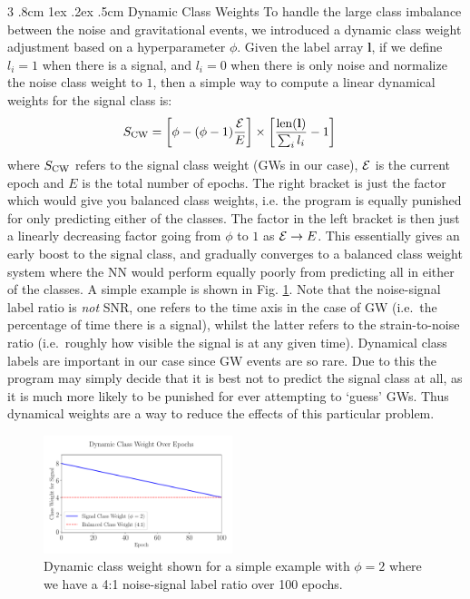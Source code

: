 \documentclass[%
reprint,
amsmath,amssymb,
aps,
]{revtex4-2}
\makeatletter
\renewcommand{\subsubsection}{%
	\@startsection
	{subsubsection}%
	{3}%
	{\z@}%
	{.8cm \@plus1ex \@minus .2ex}%
	{.5cm}%
	{\normalfont\small\centering}%
}
\makeatother
\begin{document}
\subsubsection{Dynamic Class Weights}
To handle the large class imbalance between the noise and gravitational events, we introduced a dynamic class weight adjustment based on a hyperparameter $\phi$. Given the label array $\textbf{l}$, if we define $l_i=1$ when there is a signal, and $l_i=0$ when there is only noise and normalize the noise class weight to $1$, then a simple way to compute a linear dynamical weights for the signal class is:
\begin{align}
	S_{\rm CW}&=\left[\phi-(\phi-1)\frac{\varE}{E}\right]\times\left[\frac{{\rm len}(\textbf{l})}{\sum_i l_i}-1\right]
\end{align}
where $S_{\rm CW}$ refers to the signal class weight (GWs in our case), $\varE$ is the current epoch and $E$ is the total number of epochs. The right bracket is just the factor which would give you balanced class weights, i.e. the program is equally punished for only predicting either of the classes. The factor in the left bracket is then just a linearly decreasing factor going from $\phi$ to $1$ as $\varE\to E$. This essentially gives an early boost to the signal class, and gradually converges to a balanced class weight system where the NN would perform equally poorly from predicting all in either of the classes. A simple example is shown in Fig. \ref{fig:DynamicCW}. Note that the noise-signal label ratio is \textit{not} SNR, one refers to the time axis in the case of GW (i.e.~the percentage of time there is a signal), whilst the latter refers to the strain-to-noise ratio (i.e.~roughly how visible the signal is at any given time). Dynamical class labels are important in our case since GW events are so rare. Due to this the program may simply decide that it is best not to predict the signal class at all, as it is much more likely to be punished for ever attempting to `guess' GWs. Thus dynamical weights are a way to reduce the effects of this particular problem.
\begin{figure}[ht!]
	\includegraphics[width=0.49\textwidth]{Figures/DynamicCW.pdf}
	\caption{Dynamic class weight shown for a simple example with $\phi=2$ where we have a 4:1 noise-signal label ratio over 100 epochs.}
	\label{fig:DynamicCW}
\end{figure}
\end{document}
